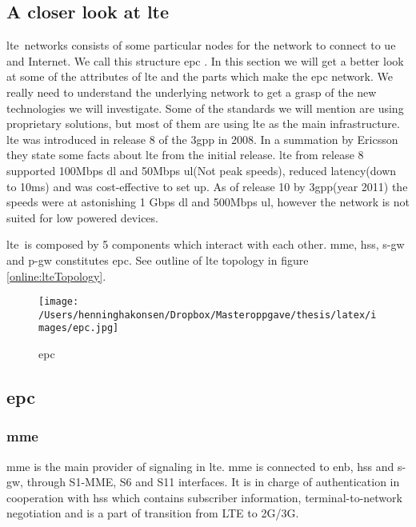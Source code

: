 \documentclass[USenglish]{ifimaster}  %
\begin{document}
\subsection{A closer look at \acrshort{lte}} \label{ssection:lte}
\acrfull{lte} networks consists of some particular nodes for the network to connect to \acrfull{ue} and Internet. We call this structure \acrfull{epc} \cite{online:epc}. In this section we will get a better look at some of the attributes of \acrshort{lte} and the parts which make the \acrshort{epc} network. We really need to understand the underlying network to get a grasp of the new technologies we will investigate. Some of the standards we will mention are using proprietary solutions, but most of them are using \acrshort{lte} as the main infrastructure. \acrshort{lte} was introduced in release 8 of the \acrshort{3gpp} in 2008. In a summation by Ericsson they state some facts about \acrshort{lte} from the initial release. \acrshort{lte} from release 8 supported 100Mbps \acrshort{dl} and 50Mbps \acrshort{ul}(Not peak speeds), reduced latency(down to 10ms) and was cost-effective to set up. \cite{online:lteIntroduction} As of release 10 by \acrshort{3gpp}(year 2011) the speeds were at astonishing 1 Gbps \acrshort{dl} and 500Mbps \acrshort{ul}, however the network is not suited for low powered devices.


\acrshort{lte} is composed by 5 components which interact with each other. \acrshort{mme}, \acrshort{hss}, \acrshort{s-gw} and \acrshort{p-gw} constitutes \acrfull{epc}. See outline of \acrshort{lte} topology in figure \vref{online:lteTopology}.
\begin{figure}[ht]
  \centering\texttt{[image: /Users/henninghakonsen/Dropbox/Masteroppgave/thesis/latex/images/epc.jpg]}
  \caption{\acrlong{epc} \cite{online:lteTopology}}
  \label{online:lteTopology}
\end{figure}

\subsection{\acrshort{epc}}

\subsubsection{\acrshort{mme}}
\acrfull{mme} is the main provider of signaling in \acrshort{lte}. \acrshort{mme} is connected to \acrshort{enb}, \acrshort{hss} and \acrshort{s-gw}, through S1-MME, S6 and S11 interfaces. It is in charge of authentication in cooperation with \acrshort{hss} which contains subscriber information, terminal-to-network negotiation and is a part of transition from LTE to 2G/3G.
\end{document}
